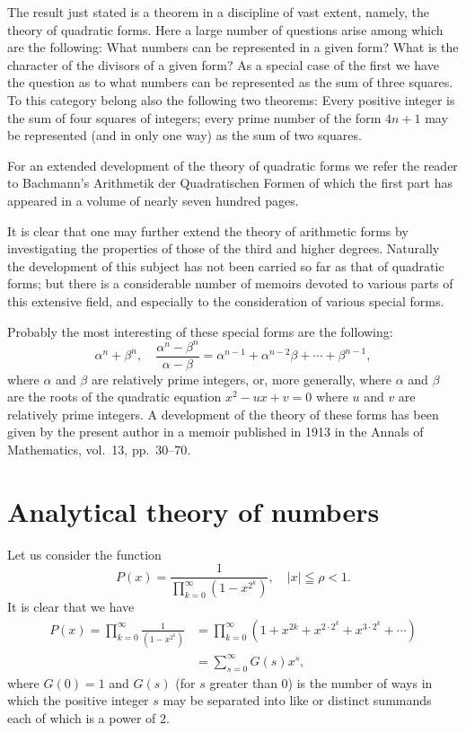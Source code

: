 \documentclass[oneside]{book}
\begin{document}
The result just stated is a theorem in a discipline of vast extent,
namely, the theory of quadratic forms. Here a large number of
questions arise among which are the following: What numbers can be
represented in a given form? What is the character of the divisors
of a given form? As a special case of the first we have the question
as to what numbers can be represented as the sum of three squares.
To this category belong also the following two theorems: Every
positive integer is the sum of four squares of integers; every prime
number of the form $4n + 1$ may be represented (and in only one way)
as the sum of two squares.

For an extended development of the theory of quadratic forms we
refer the reader to Bachmann's Arithmetik der Quadratischen Formen
of which the first part has appeared in a volume of nearly seven
hundred pages.

It is clear that one may further extend the theory of arithmetic
forms by investigating the properties of those of the third and
higher degrees. Naturally the development of this subject has not
been carried so far as that of quadratic forms; but there is a
considerable number of memoirs devoted to various parts of this
extensive field, and especially to the consideration of various
special forms.

Probably the most interesting of these special forms are the
following:
\begin{equation*}
\alpha^n + \beta^n , \quad
  \frac{\alpha^n - \beta^n}{\alpha - \beta} =
    \alpha^{n-1} + \alpha^{n-2} \beta + \cdots + \beta^{n-1},
\end{equation*}
where $\alpha$ and $\beta$ are relatively prime integers, or, more
generally, where $\alpha$ and $\beta$ are the roots of the quadratic
equation $x^2 - ux + v = 0$ where $u$ and $v$ are relatively prime
integers. A development of the theory of these forms has been given
by the present author in a memoir published in 1913 in the Annals of
Mathematics, vol.\ 13, pp.\ 30--70.%
%

\section{Analytical theory of numbers}\label{s44}%

Let us consider the function
\begin{equation*}
P(x) = \frac{1}{\prod_{k=0}^\infty (1-x^{2^k} )} , \quad
  |x|\leqq \rho < 1.
\end{equation*}
It is clear that we have
\begin{align*}
P(x) = \prod_{k=0}^\infty \frac{1}{(1-x^{2^k} )} &=
  \prod_{k=0}^\infty
       ( 1 + x^{2k} + x^{2\cdot 2^k} + x^{3\cdot 2^k} + \cdots ) \\
&= \sum_{s=0}^\infty G(s) x^s,
\end{align*}
where $G(0) = 1$ and $G(s)$ (for $s$ greater than $0$) is the number
of ways in which the positive integer $s$ may be separated into like
or distinct summands each of which is a power of $2$.
\end{document}
